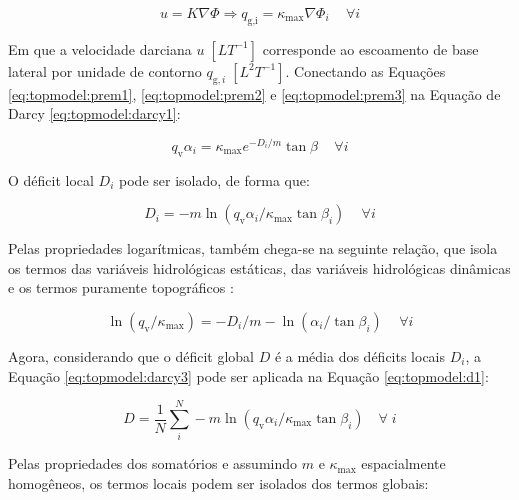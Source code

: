 \documentclass[./main.tex]{subfiles}
\begin{document}
\begin{linenomath*}
\begin{equation}
\label{eq:topmodel:darcy1}
u = K \nabla \Phi \Rightarrow q_{\text{g,i}} = \kappa_{\text{max}} \nabla \Phi_{i} \quad \, \forall i
\end{equation}
\end{linenomath*}
Em que a velocidade darciana $u \; [LT^{-1}]$ corresponde ao escoamento de base lateral por unidade de contorno $q_{\text{g}, i}\; [L^{2}T^{-1}]$. Conectando as Equações \eqref{eq:topmodel:prem1}, \eqref{eq:topmodel:prem2} e \eqref{eq:topmodel:prem3} na Equação de Darcy \eqref{eq:topmodel:darcy1}:
\begin{linenomath*}
\begin{equation}
\label{eq:topmodel:darcy2}
q_{\text{v}} \alpha_{i} = \kappa_{\text{max}} e^{-D_{i}/m} \tan \beta  \quad \, \forall i
\end{equation}
\end{linenomath*}
O déficit local $D_i$ pode ser isolado, de forma que:
\begin{linenomath*}
\begin{equation}
\label{eq:topmodel:darcy3}
D_{i} = -m \ln{(q_{\text{v}} \alpha_{i} /\kappa_{\text{max}}\tan \beta_{i})}  \quad \, \forall i
\end{equation}
\end{linenomath*}
Pelas propriedades logarítmicas, também chega-se na seguinte relação, que isola os termos das variáveis hidrológicas  estáticas, das variáveis hidrológicas dinâmicas e os termos puramente topográficos :
\begin{linenomath*}
\begin{equation}
\label{eq:topmodel:plug1}
\ln(q_{\text{v}}/\kappa_{\text{max}}) = - D_{i}/m - \ln(\alpha_{i} / \tan \beta_{i})  \quad \, \forall i
\end{equation}
\end{linenomath*}
Agora, considerando que o déficit global $D$ é a média dos déficits locais $D_i$, a Equação \eqref{eq:topmodel:darcy3} pode ser aplicada na Equação \eqref{eq:topmodel:d1}:
\begin{linenomath*}
\begin{equation}
\label{eq:topmodel:d6}
D = \frac{1}{N} \sum^{N}_{i} -m \ln{(q_{\text{v}} \alpha_{i} /\kappa_{\text{max}}\tan \beta_{i})} \quad  \forall \; i 
\end{equation}
\end{linenomath*}
Pelas propriedades dos somatórios e assumindo $m$ e $\kappa_{\text{max}}$ espacialmente homogêneos, os termos locais podem ser isolados dos termos globais:
\end{document}
